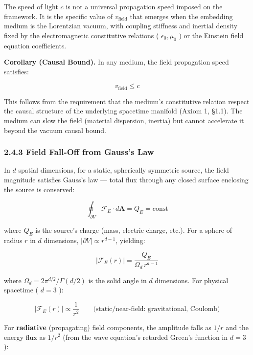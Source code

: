 \documentclass[11pt,a4paper]{article}
\theoremstyle{definition}
\theoremstyle{remark}
\begin{document}
The speed of light $c$ is not a universal propagation speed imposed on the framework. It is the specific value of $v_{\text{field}}$ that emerges when the embedding medium is the Lorentzian vacuum, with coupling stiffness and inertial density fixed by the electromagnetic constitutive relations ( $\epsilon_0, \mu_0$ ) or the Einstein field equation coefficients.

\textbf{Corollary (Causal Bound).} In any medium, the field propagation speed satisfies:


\begin{equation}
v_{\text{field}} \leq c
\end{equation}


This follows from the requirement that the medium's constitutive relation respect the causal structure of the underlying spacetime manifold (Axiom 1, \S 1.1). The medium can slow the field (material dispersion, inertia) but cannot accelerate it beyond the vacuum causal bound.

\subsubsection{2.4.3 Field Fall-Off from Gauss's Law}

In $d$ spatial dimensions, for a static, spherically symmetric source, the field magnitude satisfies Gauss's law — total flux through any closed surface enclosing the source is conserved:


\begin{equation}
\oint_{\partial V} \mathcal{F}_E \cdot d\mathbf{A} = Q_E = \text{const}
\end{equation}


where $Q_E$ is the source's charge (mass, electric charge, etc.). For a sphere of radius $r$ in $d$ dimensions, $|\partial V| \propto r^{d-1}$, yielding:


\begin{equation}
\boxed{|\mathcal{F}_E(r)| = \frac{Q_E}{\Omega_d \, r^{d-1}}}
\end{equation}


where $\Omega_d = 2\pi^{d/2}/\Gamma(d/2)$ is the solid angle in $d$ dimensions. For physical spacetime ( $d = 3$ ):


\begin{equation}
|\mathcal{F}_E(r)| \propto \frac{1}{r^2} \qquad \text{(static/near-field: gravitational, Coulomb)}
\end{equation}


For \textbf{radiative} (propagating) field components, the amplitude falls as $1/r$ and the energy flux as $1/r^2$ (from the wave equation's retarded Green's function in $d = 3$ ):
\end{document}
